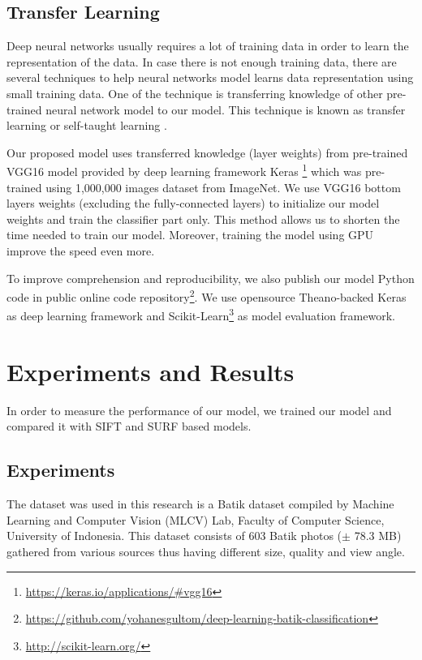 \documentclass[conference]{IEEEtran}
\begin{document}
\subsection{Transfer Learning}

Deep neural networks usually requires a lot of training data in order to learn the representation of the data. In case there is not enough training data, there are several techniques to help neural networks model learns data representation using small training data. One of the technique is transferring knowledge of other pre-trained neural network model to our model. This technique is known as transfer learning or self-taught learning \cite{raina2007self}.

Our proposed model uses transferred knowledge (layer weights) from pre-trained VGG16 model provided by deep learning framework Keras \footnote{\url{https://keras.io/applications/\#vgg16}} which was pre-trained using 1,000,000 images dataset from ImageNet. We use VGG16 bottom layers weights (excluding the fully-connected layers) to initialize our model weights and train the classifier part only. This method allows us to shorten the time needed to train our model. Moreover, training the model using GPU improve the speed even more.

To improve comprehension and reproducibility, we also publish our model Python code in public online code repository\footnote{\url{https://github.com/yohanesgultom/deep-learning-batik-classification}}. We use opensource Theano-backed Keras as deep learning framework and Scikit-Learn\footnote{\url{http://scikit-learn.org/}} as model evaluation framework.

\section{Experiments and Results}

In order to measure the performance of our model, we trained our model and compared it with SIFT and SURF based models.

\subsection{Experiments}

The dataset was used in this research is a Batik dataset compiled by Machine Learning and Computer Vision (MLCV) Lab, Faculty of Computer Science, University of Indonesia. This dataset consists of 603 Batik photos ($\pm$ 78.3 MB) gathered from various sources thus having different size, quality and view angle.
\end{document}
